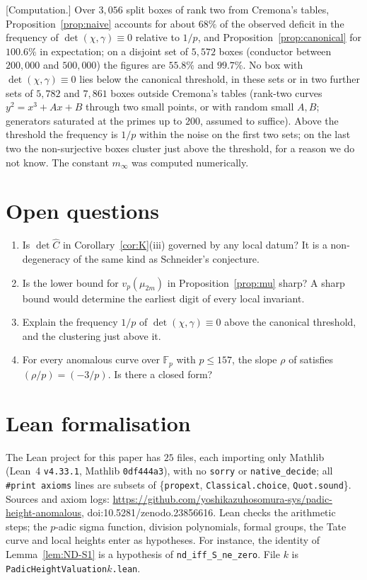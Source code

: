 \documentclass[11pt,a4paper]{amsart}
\newcommand{\lean}[1]{\nolinkurl{#1}}
\newcommand{\Fp}{\mathbb{F}_p}
\theoremstyle{plain}
\theoremstyle{definition}
\theoremstyle{remark}
\begin{document}
[Computation.] Over $3{,}056$ split boxes of rank two from Cremona's tables, Proposition~\ref{prop:naive} accounts for about $68\%$ of the observed deficit in the frequency of $\det(\chi,\gamma)\equiv0$ relative to $1/p$, and Proposition~\ref{prop:canonical} for $100.6\%$ in expectation; on a disjoint set of $5{,}572$ boxes (conductor between $200{,}000$ and $500{,}000$) the figures are $55.8\%$ and $99.7\%$. No box with $\det(\chi,\gamma)\equiv0$ lies below the canonical threshold, in these sets or in two further sets of $5{,}782$ and $7{,}861$ boxes outside Cremona's tables (rank-two curves $y^2=x^3+Ax+B$ through two small points, or with random small $A,B$; generators saturated at the primes up to $200$, assumed to suffice). Above the threshold the frequency is $1/p$ within the noise on the first two sets; on the last two the non-surjective boxes cluster just above the threshold, for a reason we do not know. The constant $m_\infty$ was computed numerically.

\section{Open questions}\label{sec:open}

\begin{enumerate}[label=(\arabic*)]
\item Is $\det\widehat C$ in Corollary~\ref{cor:K}(iii) governed by any local datum? It is a non-degeneracy of the same kind as Schneider's conjecture.
\item Is the lower bound for $v_p(\mu_{2m})$ in Proposition~\ref{prop:mu} sharp? A sharp bound would determine the earliest digit of every local invariant.
\item Explain the frequency $1/p$ of $\det(\chi,\gamma)\equiv0$ above the canonical threshold, and the clustering just above it.
\item [Computation] For every anomalous curve over $\Fp$ with $p\le157$, the slope $\rho$ of \cite[App.~A]{P1} satisfies $(\rho/p)=(-3/p)$. Is there a closed form?
\end{enumerate}

\appendix

\section{Lean formalisation}\label{app:lean}

The Lean project for this paper has $25$ files, each importing only Mathlib (Lean~4 \texttt{v4.33.1}, Mathlib \texttt{0df444a3}), with no \texttt{sorry} or \texttt{native\_decide}; all \texttt{\#print axioms} lines are subsets of \{\texttt{propext}, \texttt{Classical.choice}, \texttt{Quot.sound}\}. Sources and axiom logs: \url{https://github.com/yoshikazuhosomura-sys/padic-height-anomalous}, doi:10.5281/zenodo.23856616. Lean checks the arithmetic steps; the $p$-adic sigma function, division polynomials, formal groups, the Tate curve and local heights enter as hypotheses. For instance, the identity of Lemma~\ref{lem:ND-S1} is a hypothesis of \lean{nd_iff_S_ne_zero}. File $k$ is \texttt{PadicHeightValuation}$k$\texttt{.lean}.
\end{document}
